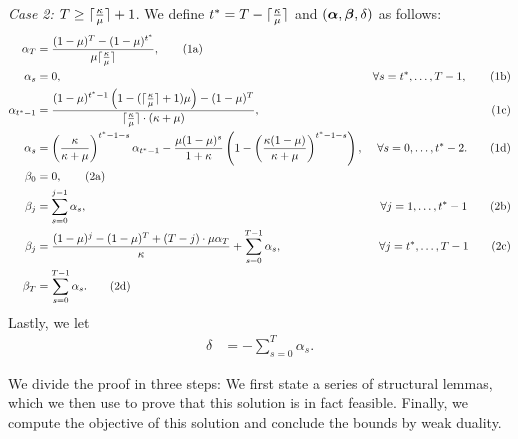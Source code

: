 \emph{Case 2: $T \geq \lceil \frac{\kappa}{\mu} \rceil + 1$}. We define $t^* = T - \lceil \frac{\kappa}{\mu} \rceil$ and $(\bm{\alpha}, \bm{\beta}, \delta)$ as follows:
        \begin{align*}
        \alpha_T &=  \frac{ (1-\mu)^T - (1-\mu)^{t^*} }{\mu \lceil \frac{\kappa}{\mu}\rceil}, \tag{1a} \label{1a}\\
        \alpha_s &= 0,  &\forall s = t^*, \ldots, T-1, \tag{1b} \label{1b}\\ 
        \alpha_{t^*-1} &=  \frac{(1-\mu)^{t^*-1} \left(1 - (\lceil \frac{\kappa}{\mu}\rceil+1)\mu \right) - (1-\mu)^T}{\lceil \frac{\kappa}{\mu} \rceil \cdot (\kappa+\mu)}, & \tag{1c} \label{1c}\\
        \alpha_s &= \left(\frac{\kappa}{\kappa+\mu}\right)^{t^* - 1 - s} \alpha_{t^* -1} - \frac{\mu (1-\mu)^{s}}{ 1+ \kappa} \left( 1 - \left( \frac{\kappa(1-\mu)}{\kappa +\mu} \right)^{t^* - 1 - s} \right), & \forall s = 0, \ldots, t^* - 2. \tag{1d} \label{1d}\\
        \beta_{0} &= 0, \tag{2a} \label{2a}\\
        \beta_{j} &= \sum_{s=0}^{j-1} \alpha_s, & \forall j = 1, \ldots, {t^*-1} \tag{2b} \label{2b}\\
        \beta_{j} &=  \frac{(1-\mu)^j - (1-\mu)^T + (T-j) \cdot \mu \alpha_T}{\kappa} + \sum_{s=0}^{T-1} \alpha_s, & \forall j = t^*, \ldots, T-1 \tag{2c} \label{2c}\\
        \beta_{T} &= \sum_{s=0}^{T-1} \alpha_s. \tag{2d} \label{2d}
    \end{align*}
    Lastly, we let
    \begin{align*}
        \delta &= -\sum_{s=0}^T \alpha_s. \tag{3a} \label{4a}
    \end{align*}
    
    We divide the proof in three steps: We first state a series of structural lemmas, which we then use to prove that this solution is in fact feasible. %
    Finally, we compute the objective of this solution and conclude the bounds by weak duality.\\

